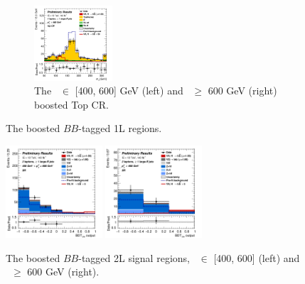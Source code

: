 \begin{figure}[h!]
\begin{subfigure}[b]{\textwidth}
        \includegraphics[width=0.32\textwidth]{Images/VH/Own_fit/postfit_VHbb/Region_distmBB_BMin600_incFat1_Fat1_DSRtopaddbjetcr_J0_TTypebb_incJet1_T2_L1_Y6051_GlobalFit_conditionnal_mu1.png}
        \caption{The \ptv\ $\in$ [400, 600] GeV (left) and \ptv\ $\geq$ 600 GeV (right) boosted Top CR.}
        \label{fig:plots_VHbbBoost_1L_topCR}
    \end{subfigure}
    \caption{The boosted $BB$-tagged 1L regions.}
    \label{fig:plots_VHbbBoost_1L}
\end{figure} 


\begin{figure}[h!]
    \centering
    \includegraphics[width=0.32\textwidth]{Images/VH/Own_fit/postfit_VHbb/Region_distmva_BMax600_BMin400_incFat1_Fat1_DSR_J0_TTypebb_incJet1_T2_L2_Y6051_GlobalFit_conditionnal_mu1.png}
    \includegraphics[width=0.32\textwidth]{Images/VH/Own_fit/postfit_VHbb/Region_distmva_BMin600_incFat1_Fat1_DSR_J0_TTypebb_incJet1_T2_L2_Y6051_GlobalFit_conditionnal_mu1.png}
    \caption{The boosted $BB$-tagged 2L signal regions, \ptv\ $\in$ [400, 600] (left) and \ptv\ $\geq$ 600 GeV (right).}
    \label{fig:plots_VHbbBoost_2L_SR}
\end{figure} 

